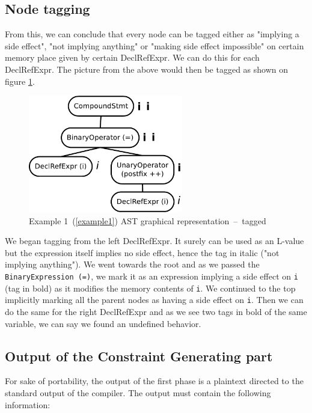 \subsection{Node tagging}
From this, we can conclude that every node can be tagged either as "implying a side effect", "not implying anything" or "making side effect impossible" on certain memory place given by certain DeclRefExpr. We can do this for each DeclRefExpr. The picture from the above would then be tagged as shown on figure \ref{ASTtagged}.
\begin{figure}
    \caption{Example 1~(\ref{example1}) AST graphical representation~--~tagged}
    \label{ASTtagged}
    \centering
        \includegraphics[width=0.6\textwidth]{fig/example1G-tagged.pdf}
\end{figure}

We began tagging from the left DeclRefExpr. It surely can be used as an L-value but the expression itself implies no side effect, hence the tag in italic ("not implying anything"). We went towards the root and as we passed the \verb|BinaryExpression (=)|, we mark it as an expression implying a side effect on \verb|i| (tag in bold) as it modifies the memory contents of \verb|i|. We continued to the top implicitly marking all the parent nodes as having a side effect on \verb|i|. Then we can do the same for the right DeclRefExpr and as we see two tags in bold of the same variable, we can say we found an undefined behavior.


\subsection{Output of the Constraint Generating part}
For sake of portability, the output of the first phase is a plaintext directed to the standard output of the compiler. The output must contain the following information:

